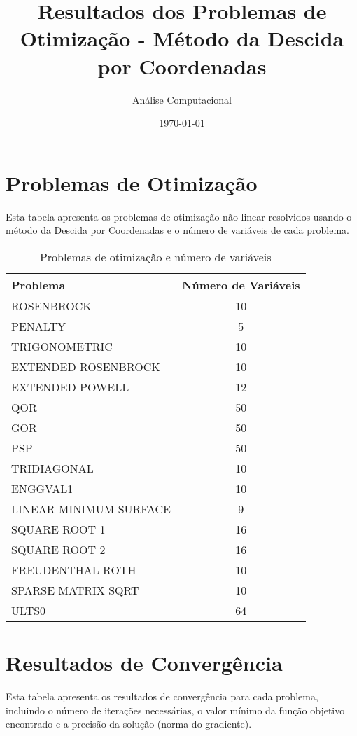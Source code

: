 \documentclass[12pt]{article}
\title{Resultados dos Problemas de Otimização - Método da Descida por Coordenadas}
\author{Análise Computacional}
\date{\today}
\begin{document}
\maketitle

\section{Problemas de Otimização}

Esta tabela apresenta os problemas de otimização não-linear resolvidos usando o método da Descida por Coordenadas e o número de variáveis de cada problema.

\begin{table}[h!]
\centering
\caption{Problemas de otimização e número de variáveis}
\label{tab:problemas_variáveis}
\begin{tabular}{@{}lc@{}}
\toprule
\textbf{Problema} & \textbf{Número de Variáveis} \\
\midrule
ROSENBROCK & 10 \\
PENALTY & 5 \\
TRIGONOMETRIC & 10 \\
EXTENDED ROSENBROCK & 10 \\
EXTENDED POWELL & 12 \\
QOR & 50 \\
GOR & 50 \\
PSP & 50 \\
TRIDIAGONAL & 10 \\
ENGGVAL1 & 10 \\
LINEAR MINIMUM SURFACE & 9 \\
SQUARE ROOT 1 & 16 \\
SQUARE ROOT 2 & 16 \\
FREUDENTHAL ROTH & 10 \\
SPARSE MATRIX SQRT & 10 \\
ULTS0 & 64 \\
\bottomrule
\end{tabular}
\end{table}

\section{Resultados de Convergência}

Esta tabela apresenta os resultados de convergência para cada problema, incluindo o número de iterações necessárias, o valor mínimo da função objetivo encontrado e a precisão da solução (norma do gradiente).
\end{document}
